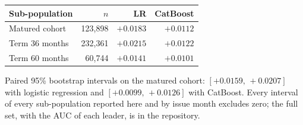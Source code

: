\documentclass[final,5p,twocolumn]{elsarticle}
\providecommand{\DIFaddtex}[1]{{\protect\color{blue} \sf #1}} %
\providecommand{\DIFaddbegin}{} %
\providecommand{\DIFaddend}{} %
\providecommand{\DIFdelend}{} %
\providecommand{\DIFaddFL}[1]{\DIFadd{#1}} %
\providecommand{\DIFaddbeginFL}{} %
\providecommand{\DIFaddendFL}{} %
\providecommand{\DIFdelbeginFL}{} %
\providecommand{\DIFdelendFL}{} %
\providecommand{\DIFadd}[1]{\texorpdfstring{\DIFaddtex{#1}}{#1}} %
\begin{document}
\begin{table}[htbp]
\begin{threeparttable}
\DIFdelendFL \DIFaddbeginFL \label{tab:lc_maturity}
\setlength{\tabcolsep}{5pt}
\begin{tabular}{@{}lrrr@{}}
\toprule
Sub-population & $n$ & LR & CatBoost \\
\midrule
Matured cohort\tnote{a} & 123,898 & $+0.0183$ & $+0.0112$ \\
Term 36 months & 232,361 & $+0.0215$ & $+0.0122$ \\
Term 60 months & 60,744 & $+0.0141$ & $+0.0101$ \\
\bottomrule
\end{tabular}
\begin{tablenotes}\footnotesize
\item[\DIFaddFL{a}] \DIFaddFL{Paired 95\% bootstrap intervals on the matured cohort: $[+0.0159,\,+0.0207]$ with logistic regression and $[+0.0099,\,+0.0126]$ with CatBoost. Every interval of every sub-population reported here and by issue month excludes zero; the full set, with the AUC of each leader, is in the repository.
}\end{tablenotes}
\DIFaddendFL \end{threeparttable}
\DIFdelbeginFL %
\DIFdelend \DIFaddbegin \end{table}
\DIFaddend 
\end{document}
